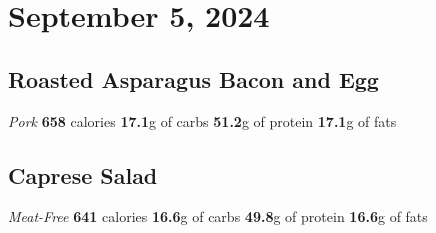 \documentclass{article}%
\begin{document}
\section*{September 5, 2024}%
\label{sec:September5,2024}%
\begin{paracol}[2]{2}%
\sloppy%
\subsection*{Roasted Asparagus Bacon and Egg}%
\label{subsec:RoastedAsparagusBaconandEgg}%
\textit{Pork}%
\newline%
\newline%
\textbf{658} calories%
\newline%
\textbf{17.1}g of carbs%
\newline%
\textbf{51.2}g of protein%
\newline%
\textbf{17.1}g of fats%
\newline%
\switchcolumn

%
\subsection*{Caprese Salad}%
\label{subsec:CapreseSalad}%
\textit{Meat{-}Free}%
\newline%
\newline%
\textbf{641} calories%
\newline%
\textbf{16.6}g of carbs%
\newline%
\textbf{49.8}g of protein%
\newline%
\textbf{16.6}g of fats%
\newline%
\switchcolumn

%
\end{paracol}

%
\end{document}
